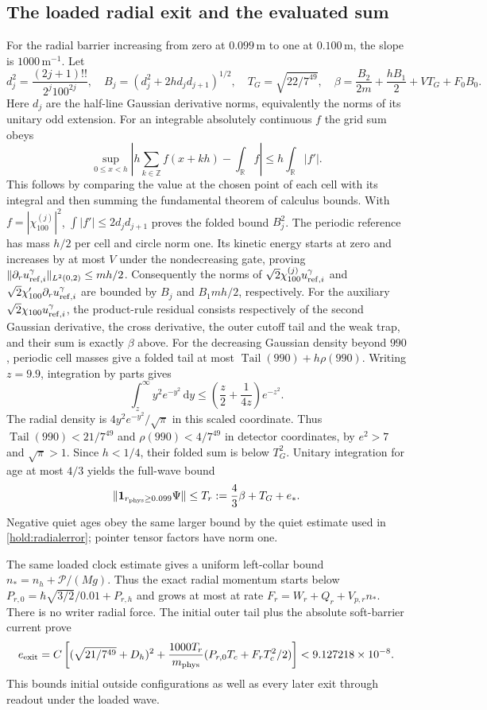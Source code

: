 \documentclass[11pt]{article}
\theoremstyle{definition}\newtheorem{definition}[theorem]{Definition}
\theoremstyle{remark}\newtheorem{remark}[theorem]{Remark}
\newcommand{\one}{\mathbf1}\newcommand{\R}{\mathbb R}\newcommand{\T}{\mathbb T}
\newcommand{\dd}{\,\mathrm d}\newcommand{\Imv}{\operatorname{Im}}\newcommand{\ii}{\mathrm i}
\begin{document}
\subsection{The loaded radial exit and the evaluated sum}
\label{hold:exit}
For the radial barrier increasing from zero at $0.099\,\mathrm m$
to one at $0.100\,\mathrm m$, the slope is
$1000\,\mathrm m^{-1}$.  Let
\[
 d_j^2=\frac{(2j+1)!!}{2^j100^{2j}},\quad
 B_j=(d_j^2+2hd_jd_{j+1})^{1/2},\quad
 T_G=\sqrt{22/7^{49}},\quad
 \beta=\frac{B_2}{2m}+\frac{hB_1}{2}+VT_G+F_0B_0.
\]
Here $d_j$ are the half-line Gaussian derivative norms, equivalently
the norms of its unitary odd extension.  For an integrable absolutely
continuous $f$ the grid sum obeys
\[
 \sup_{0\leq x<h}\left|h\sum_{k\in\mathbb Z}f(x+kh)
                      -\int_{\mathbb R}f\right|
       \leq h\int_{\mathbb R}|f'|.
\]
This follows by comparing the value at the chosen point of each
cell with its integral and then summing the fundamental theorem of
calculus bounds.  With $f=|\chi_{100}^{(j)}|^2$,
$\int|f'|\leq2d_jd_{j+1}$ proves the folded bound $B_j^2$.
The periodic reference has mass $h/2$ per cell and circle norm one.
Its kinetic energy starts at zero and increases by at most $V$ under
the nondecreasing gate, proving
$\|\partial_ru_{{\rm ref},i}^{\gamma}\|_{L^2(0,2)}\leq mh/2$.
Consequently the norms of
$\sqrt2\chi_{100}^{(j)}u_{{\rm ref},i}^{\gamma}$ and
$\sqrt2\chi_{100}'\partial_ru_{{\rm ref},i}^{\gamma}$
are bounded by $B_j$ and $B_1mh/2$, respectively.
For the auxiliary $\sqrt2\chi_{100}u_{{\rm ref},i}^{\gamma}$,
the product-rule residual consists respectively of the second
Gaussian derivative, the cross derivative, the outer cutoff tail
and the weak trap, and their sum is exactly $\beta$ above.
For the decreasing Gaussian density beyond $990$, periodic cell
masses give a folded tail at most
$\operatorname{Tail}(990)+h\rho(990)$.
Writing $z=9.9$, integration by parts gives
\[
 \int_z^\infty y^2e^{-y^2}\dd y
 \leq\left(\frac z2+\frac{1}{4z}\right)e^{-z^2}.
\]
The radial density is $4y^2e^{-y^2}/\sqrt\pi$ in this scaled
coordinate.  Thus $\operatorname{Tail}(990)<21/7^{49}$ and
$\rho(990)<4/7^{49}$ in detector coordinates, by $e^2>7$ and
$\sqrt\pi>1$.  Since $h<1/4$, their folded sum is below $T_G^2$.
Unitary integration for age at most $4/3$ yields the full-wave bound
\[
 \|\one_{r_{\rm phys}\geq0.099}\Psi\|
 \leq T_r:=\frac43\beta+T_G+e_*.
\]
Negative quiet ages obey the same larger bound by the quiet estimate
used in \eqref{hold:radialerror}; pointer tensor factors have norm one.

The same loaded clock estimate gives a uniform left-collar bound
$n_*=n_h+\mathcal P/(Mg)$.  Thus the exact radial momentum starts
below $P_{r,0}=\hbar\sqrt{3/2}/0.01+P_{r,h}$ and grows at most at
rate $F_r=W_r+Q_r+V_{p,r}n_*$.  There is no writer radial force.
The initial outer tail plus the absolute soft-barrier current prove
\begin{equation}\label{hold:radialexit}
 e_{\rm exit}=C\left[
 (\sqrt{21/7^{49}}+D_h)^2
 +\frac{1000T_r}{m_{\rm phys}}
       (P_{r,0}T_c+F_rT_c^2/2)\right]
 <9.127218\times10^{-8}.
\end{equation}
This bounds initial outside configurations as well as every later
exit through readout under the loaded wave.
\end{document}
